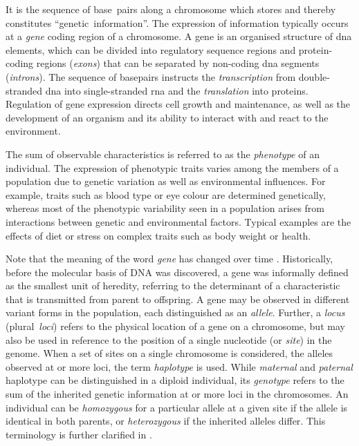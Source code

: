 %

%

It is the sequence of base~pairs along a chromosome which stores and thereby constitutes ``genetic~information''.
The expression of information typically occurs at a \emph{gene} coding region of a chromosome.
A gene is an organised structure of \gls{dna} elements, which can be divided into regulatory sequence regions and protein-coding regions (\emph{exons}) that can be separated by non-coding \gls{dna} segments (\emph{introns}).
The sequence of basepairs instructs the \emph{transcription} from double-stranded \gls{dna} into single-stranded \gls{rna} and the \emph{translation} into proteins.
Regulation of gene expression directs cell growth and maintenance, as well as the development of an organism and its ability to interact with and react to the environment.

The sum of observable characteristics is referred to as the \emph{phenotype} of an individual.
The expression of phenotypic traits varies among the members of a population due to genetic variation as well as environmental influences.
For example, traits such as blood type or eye colour are determined genetically, whereas most of the phenotypic variability seen in a population arises from interactions between genetic and environmental factors.
Typical examples are the effects of diet or stress on complex traits such as body weight or health.

%

%

Note that the meaning of the word \emph{gene} has changed over time \citep[\eg see][]{slack2014genes}.
Historically, before the molecular basis of DNA was discovered, a gene was informally defined as the smallest unit of heredity, referring to the determinant of a characteristic that is transmitted from parent to offspring.
A gene may be observed in different variant forms in the population, each distinguished as an \emph{allele}.
Further, a \emph{locus} (plural~\emph{loci}) refers to the physical location of a gene on a chromosome, but may also be used in reference to the position of a single nucleotide (or \emph{site}) in the genome.
When a set of sites on a single chromosome is considered, \ie the alleles observed at  or more loci, the term \emph{haplotype} is used.
While  \emph{maternal} and  \emph{paternal} haplotype can be distinguished in a diploid individual, its \emph{genotype} refers to the sum of the inherited genetic information at  or more loci in the  chromosomes.
An individual can be \emph{homozygous} for a particular allele at a given site if the allele is identical in both parents, or \emph{heterozygous} if the inherited alleles differ.
This terminology is further clarified in .

